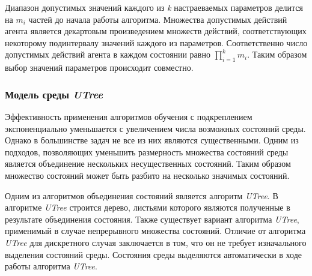 Диапазон допустимых значений каждого из \textit{k} настраеваемых параметров делится на $m_i$ частей до начала работы алгоритма. Множества допустимых действий агента является декартовым произведением множеств действий, соответствующих некоторому подинтервалу значений каждого из параметров. Соответственно число допустимых действий агента в каждом состоянии равно $\prod\limits_{i = 1}^k{m_i}$. Таким образом выбор значений параметров происходит совместно.


\subsubsection{Модель среды \textit{UTree}}
\label{utree}
Эффективность применения алгоритмов обучения с подкреплением экспоненциально уменьшается с увеличением числа возможных состояний среды. Однако в большинстве задач не все из них являются существенными. Одним из подходов, позволяющих уменьшить размерность множества состояний среды является объединение нескольких несущественных состояний. Таким образом множество состояний может быть разбито на несколько значимых состояний. 

Одним из алгоритмов объединения состояний является алгоритм \textit{UTree}. В алгоритме \textit{UTree} строится дерево, листьями которого являются полученные в результате объединения состояния. Также существует вариант алгоритма \textit{UTree}, применимый в случае непрерывного множества состояний. Отличие от алгоритма \textit{UTree} для дискретного случая заключается в том, что он не требует изначального выделения состояний среды. Состояния среды выделяются автоматически в ходе работы алгоритма \textit{UTree}.

